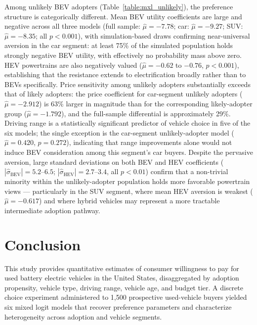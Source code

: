 \documentclass[a4paper,fleqn]{cas-sc}   %
\begin{document}
Among unlikely BEV adopters (Table~\ref{table:mxl_unlikely}), the preference structure is categorically different. Mean BEV utility coefficients are large and negative across all three models (full sample: $\hat{\mu} = -7.78$; car: $\hat{\mu} = -9.27$; SUV: $\hat{\mu} = -8.35$; all $p < 0.001$), with simulation-based draws confirming near-universal aversion in the car segment: at least 75\% of the simulated population holds strongly negative BEV utility, with effectively no probability mass above zero. HEV powertrains are also negatively valued ($\hat{\mu} = -0.62$ to $-0.76$, $p < 0.001$), establishing that the resistance extends to electrification broadly rather than to BEVs specifically. Price sensitivity among unlikely adopters substantially exceeds that of likely adopters: the price coefficient for car-segment unlikely adopters ($\hat{\mu} = -2.912$) is 63\% larger in magnitude than for the corresponding likely-adopter group ($\hat{\mu} = -1.792$), and the full-sample differential is approximately 29\%. Driving range is a statistically significant predictor of vehicle choice in five of the six models; the single exception is the car-segment unlikely-adopter model ($\hat{\mu} = 0.420$, $p = 0.272$), indicating that range improvements alone would not induce BEV consideration among this segment's car buyers. Despite the pervasive aversion, large standard deviations on both BEV and HEV coefficients ($|\hat{\sigma}_{\text{BEV}}| = 5.2$--$6.5$; $|\hat{\sigma}_{\text{HEV}}| = 2.7$--$3.4$, all $p < 0.01$) confirm that a non-trivial minority within the unlikely-adopter population holds more favorable powertrain views --- particularly in the SUV segment, where mean HEV aversion is weakest ($\hat{\mu} = -0.617$) and where hybrid vehicles may represent a more tractable intermediate adoption pathway.

\section{Conclusion}
\label{section:conclusion}

This study provides quantitative estimates of consumer willingness to pay for used battery electric vehicles in the United States, disaggregated by adoption propensity, vehicle type, driving range, vehicle age, and budget tier. A discrete choice experiment administered to 1{,}500 prospective used-vehicle buyers yielded six mixed logit models that recover preference parameters and characterize heterogeneity across adoption and vehicle segments.
\end{document}
